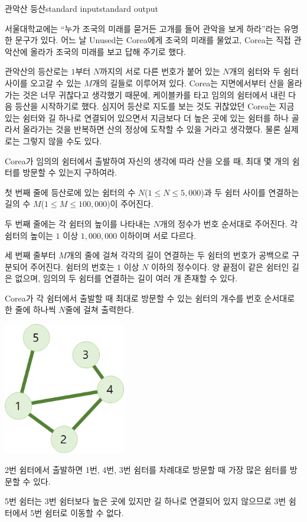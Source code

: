\begin{problem}{관악산 등산}{standard input}{standard output}

서울대학교에는 ``누가 조국의 미래를 묻거든 고개를 들어 관악을 보게 하라''라는 유명한 문구가 있다. 어느 날 Unused는 Corea에게 조국의 미래를 물었고, Corea는 직접 관악산에 올라가 조국의 미래를 보고 답해 주기로 했다.

관악산의 등산로는 $1$부터 $N$까지의 서로 다른 번호가 붙어 있는 $N$개의 쉼터와 두 쉼터 사이를 오고갈 수 있는 $M$개의 길들로 이루어져 있다. Corea는 지면에서부터 산을 올라가는 것은 너무 귀찮다고 생각했기 때문에, 케이블카를 타고 임의의 쉼터에서 내린 다음 등산을 시작하기로 했다. 심지어 등산로 지도를 보는 것도 귀찮았던 Corea는 지금 있는 쉼터와 길 하나로 연결되어 있으면서 지금보다 더 높은 곳에 있는 쉼터를 하나 골라서 올라가는 것을 반복하면 산의 정상에 도착할 수 있을 거라고 생각했다. 물론 실제로는 그렇지 않을 수도 있다.

Corea가 임의의 쉼터에서 출발하여 자신의 생각에 따라 산을 오를 때, 최대 몇 개의 쉼터를 방문할 수 있는지 구하여라.

\InputFile
첫 번째 줄에 등산로에 있는 쉼터의 수 $N$($1 \le N \le 5,000$)과 두 쉼터 사이를 연결하는 길의 수 $M$($1 \le M \le 100,000$)이 주어진다.

두 번째 줄에는 각 쉼터의 높이를 나타내는 $N$개의 정수가 번호 순서대로 주어진다. 각 쉼터의 높이는 $1$ 이상 $1,000,000$ 이하이며 서로 다르다.

세 번째 줄부터 $M$개의 줄에 걸쳐 각각의 길이 연결하는 두 쉼터의 번호가 공백으로 구분되어 주어진다. 쉼터의 번호는 $1$ 이상 $N$ 이하의 정수이다. 양 끝점이 같은 쉼터인 길은 없으며, 임의의 두 쉼터를 연결하는 길이 여러 개 존재할 수 있다.

\OutputFile
Corea가 각 쉼터에서 출발할 때 최대로 방문할 수 있는 쉼터의 개수를 번호 순서대로 한 줄에 하나씩 $N$줄에 걸쳐 출력한다.

\Example

\begin{example}
%
\end{example}

\Notes
\begin{center}
  \includegraphics[width=0.4\textwidth]{climb.png}
\end{center}

2번 쉼터에서 출발하면 1번, 4번, 3번 쉼터를 차례대로 방문할 때 가장 많은 쉼터를 방문할 수 있다.

5번 쉼터는 3번 쉼터보다 높은 곳에 있지만 길 하나로 연결되어 있지 않으므로 3번 쉼터에서 5번 쉼터로 이동할 수 없다.

\end{problem}
